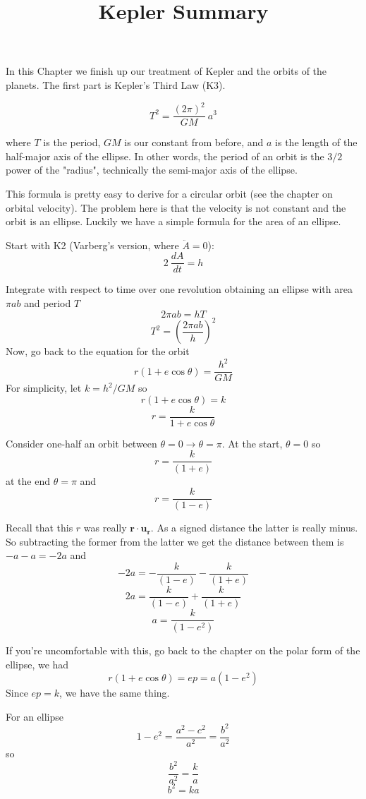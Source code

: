 \documentclass[11pt, oneside]{article}
\title{Kepler Summary}
\date{}
\begin{document}
\maketitle
\Large


In this Chapter we finish up our treatment of Kepler and the orbits of the planets.  The first part is Kepler's Third Law (K3).

\[ T^2 = \frac{(2 \pi)^2}{GM} \ a^3 \]

where $T$ is the period, $GM$ is our constant from before, and $a$ is the length of the half-major axis of the ellipse.  In other words, the period of an orbit is the $3/2$ power of the "radius", technically the semi-major axis of the ellipse.

This formula is pretty easy to derive for a circular orbit (see the chapter on orbital velocity).  The problem here is that the velocity is not constant and the orbit is an ellipse.  Luckily we have a simple formula for the area of an ellipse.

Start with K2 (Varberg's version, where $\ddot{A} = 0$):
\[ 2 \ \frac{dA}{dt} =  h \]

Integrate with respect to time over one revolution obtaining an ellipse with area $\pi a b$ and period $T$
\[ 2 \pi a b = hT \]
\[ T^2 = (\frac{2 \pi a b}{h})^2 \]
Now, go back to the equation for the orbit
\[ r(1 + e \cos \theta) = \frac{h^2}{GM} \]
For simplicity, let $k = h^2/GM$ so
\[ r(1 + e \cos \theta) = k  \]
\[ r = \frac{k}{1 + e \cos \theta}  \]

Consider one-half an orbit between $\theta = 0 \rightarrow \theta = \pi$.  At the start, $\theta = 0$ so
\[ r = \frac{k}{(1 + e)}  \]
at the end $\theta = \pi$ and
\[ r = \frac{k}{(1 - e)}  \]

Recall that this $r$ was really $\mathbf{r} \cdot \mathbf{u_r}$.  As a signed distance the latter is really minus.  So subtracting the former from the latter we get the distance between them is $-a -a = -2a$ and
\[ -2a = -  \frac{k}{(1 - e)} -  \frac{k}{(1 + e)} \]
\[ 2a = \frac{k}{(1 - e)} + \frac{k}{(1 + e)} \]
\[ a = \frac{k}{(1 - e^2)} \]

If you're uncomfortable with this, go back to the chapter on the polar form of the ellipse, we had 
\[ r(1 + e \cos \theta) = ep = a(1 - e^2) \]
Since $ep = k$, we have the same thing.

For an ellipse 
\[ 1 - e^2 = \frac{a^2 - c^2}{a^2} = \frac{b^2}{a^2} \]
so
\[ \frac{b^2}{a^2} = \frac{k}{a} \]
\[  b^2 = ka \]
\end{document}
